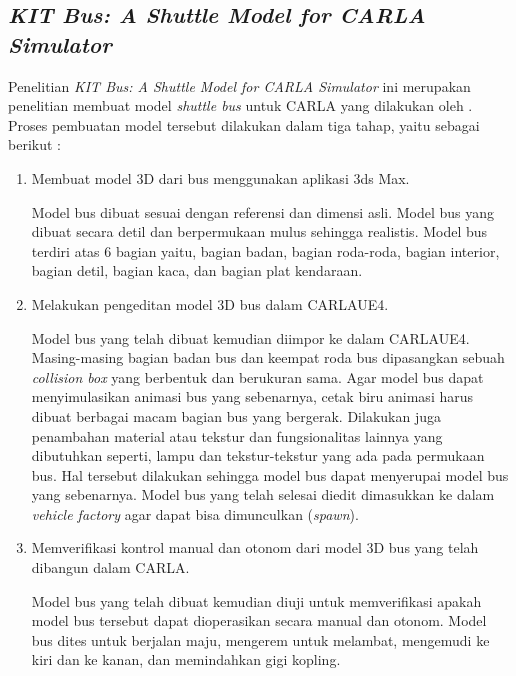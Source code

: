 \subsection{\textit{KIT Bus: A Shuttle Model for CARLA Simulator}}
Penelitian \textit{KIT Bus: A Shuttle Model for CARLA Simulator} ini merupakan
penelitian membuat model \textit{shuttle bus} untuk CARLA yang dilakukan oleh
\cite{related-work-xiang}. Proses pembuatan model tersebut dilakukan dalam tiga
tahap, yaitu sebagai berikut \parencite{related-work-xiang}:
\begin{enumerate}
    \item Membuat model 3D dari bus menggunakan aplikasi 3ds Max.

    Model bus dibuat sesuai dengan referensi dan dimensi asli. Model bus yang
    dibuat secara detil dan berpermukaan mulus sehingga realistis. Model bus
    terdiri atas 6 bagian yaitu, bagian badan, bagian roda-roda, bagian
    interior, bagian detil, bagian kaca, dan bagian plat kendaraan.

    \item Melakukan pengeditan model 3D bus dalam CARLAUE4.

    Model bus yang telah dibuat kemudian diimpor ke dalam CARLAUE4.
    Masing-masing bagian badan bus dan keempat roda bus dipasangkan sebuah
    \textit{collision box} yang berbentuk dan berukuran sama. Agar model bus
    dapat menyimulasikan animasi bus yang sebenarnya, cetak biru animasi harus
    dibuat berbagai macam bagian bus yang bergerak. Dilakukan juga penambahan
    material atau tekstur dan fungsionalitas lainnya yang dibutuhkan seperti,
    lampu dan tekstur-tekstur yang ada pada permukaan bus. Hal tersebut
    dilakukan sehingga model bus dapat menyerupai model bus yang sebenarnya.
    Model bus yang telah selesai diedit dimasukkan ke dalam \textit{vehicle
    factory} agar dapat bisa dimunculkan (\textit{spawn}).

    \item Memverifikasi kontrol manual dan otonom dari model 3D bus yang telah
    dibangun dalam CARLA.

    Model bus yang telah dibuat kemudian diuji untuk memverifikasi apakah model
    bus tersebut dapat dioperasikan secara manual dan otonom. Model bus dites
    untuk berjalan maju, mengerem untuk melambat, mengemudi ke kiri dan ke
    kanan, dan memindahkan gigi kopling.

\end{enumerate}


